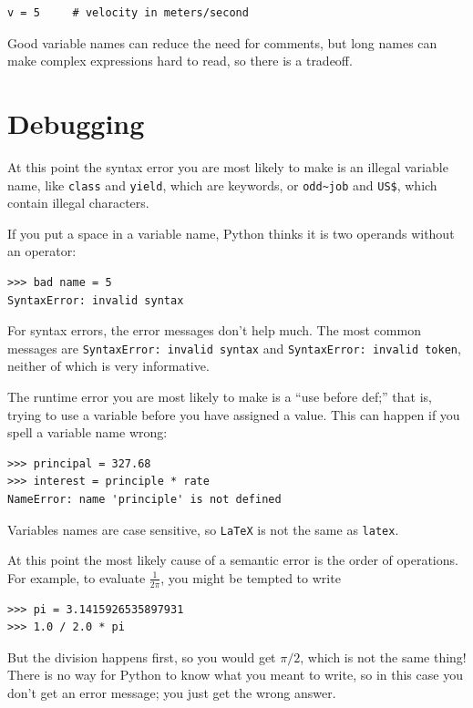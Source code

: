 \documentclass[10pt]{book}
\begin{document}
\beforeverb
\begin{verbatim}
v = 5     # velocity in meters/second
\end{verbatim}
\afterverb
%
Good variable names can reduce the need for comments, but
long names can make complex expressions hard to read, so there is
a tradeoff.

\section{Debugging}

At this point the syntax error you are most likely to make is
an illegal variable name, like {\tt class} and {\tt yield}, which
are keywords, or \verb"odd~job" and \verb"US$", which contain
illegal characters.


If you put a space in a variable name, Python thinks it is two
operands without an operator:

\beforeverb
\begin{verbatim}
>>> bad name = 5
SyntaxError: invalid syntax
\end{verbatim}
\afterverb
%
For syntax errors, the error messages don't help much.
The most common messages are {\tt SyntaxError: invalid syntax} and
{\tt SyntaxError: invalid token}, neither of which is very informative.


The runtime error you are most likely to make is a ``use before
def;'' that is, trying to use a variable before you have assigned
a value.  This can happen if you spell a variable name wrong:

\beforeverb
\begin{verbatim}
>>> principal = 327.68
>>> interest = principle * rate
NameError: name 'principle' is not defined
\end{verbatim}
\afterverb
%
Variables names are case sensitive, so {\tt LaTeX} is not the
same as {\tt latex}.


At this point the most likely cause of a semantic error is
the order of operations.  For example, to evaluate $\frac{1}{2 \pi}$,
you might be tempted to write

\beforeverb
\begin{verbatim}
>>> pi = 3.1415926535897931
>>> 1.0 / 2.0 * pi
\end{verbatim}
\afterverb
%
But the division happens first, so you would get $\pi / 2$, which
is not the same thing!  There is no way for Python
to know what you meant to write, so in this case you don't
get an error message; you just get the wrong answer.
\end{document}

